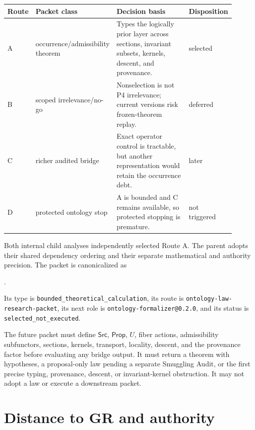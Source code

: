 \documentclass[11pt]{article}
\newcommand{\Src}{\mathsf{Src}}
\newcommand{\Prop}{\mathsf{Prop}}
\begin{document}
\begin{center}
\small
\setlength{\tabcolsep}{3pt}
\begin{tabular}{>{\raggedright\arraybackslash}p{0.07\linewidth}>{\raggedright\arraybackslash}p{0.23\linewidth}>{\raggedright\arraybackslash}p{0.49\linewidth}>{\raggedright\arraybackslash}p{0.12\linewidth}}
\toprule
Route & Packet class & Decision basis & Disposition \\
\midrule
A & occurrence/\allowbreak admissibility theorem & Types the logically prior layer across sections, invariant subsets, kernels, descent, and provenance. & selected \\
B & scoped irrelevance/no-go & Nonselection is not P4 irrelevance; current versions risk frozen-theorem replay. & deferred \\
C & richer audited bridge & Exact operator control is tractable, but another representation would retain the occurrence debt. & later \\
D & protected ontology stop & A is bounded and C remains available, so protected stopping is premature. & not triggered \\
\bottomrule
\end{tabular}
\end{center}

Both internal child analyses independently selected Route A.  The parent
adopts their shared dependency ordering and their separate mathematical and
authority precision.  The packet is canonicalized as
\begin{center}
\small
{}.
\end{center}
Its type is \texttt{bounded\_theoretical\_calculation}, its route is
\texttt{ontology-law-research-packet}, its next role is
\texttt{ontology-formalizer@0.2.0}, and its status is
\texttt{selected\_not\_executed}.

The future packet must define $\Src$, $\Prop$, $U$, fiber actions,
admissibility subfunctors, sections, kernels, transport, locality, descent,
and the provenance factor before evaluating any bridge output.  It must return
a theorem with hypotheses, a proposal-only law pending a separate Smuggling
Audit, or the first precise typing, provenance, descent, or invariant-kernel
obstruction.  It may not adopt a law or execute a downstream packet.

\section{Distance to GR and authority}
\end{document}
